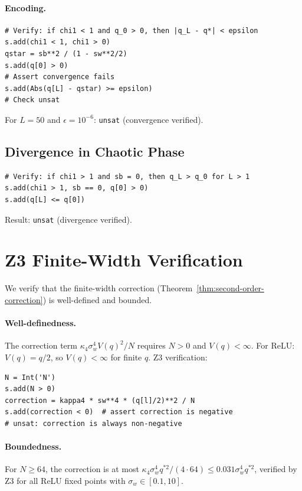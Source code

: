 \documentclass[10pt]{article}
\begin{document}
\paragraph{Encoding.}
\begin{verbatim}
# Verify: if chi1 < 1 and q_0 > 0, then |q_L - q*| < epsilon
s.add(chi1 < 1, chi1 > 0)
qstar = sb**2 / (1 - sw**2/2)
s.add(q[0] > 0)
# Assert convergence fails
s.add(Abs(q[L] - qstar) >= epsilon)
# Check unsat
\end{verbatim}

For $L = 50$ and $\epsilon = 10^{-6}$: \texttt{unsat} (convergence verified).

\subsection{Divergence in Chaotic Phase}

\begin{verbatim}
# Verify: if chi1 > 1 and sb = 0, then q_L > q_0 for L > 1
s.add(chi1 > 1, sb == 0, q[0] > 0)
s.add(q[L] <= q[0])
\end{verbatim}

Result: \texttt{unsat} (divergence verified).

\section{Z3 Finite-Width Verification}
\label{app:z3-finite-width}

We verify that the finite-width correction (Theorem~\ref{thm:second-order-correction}) is well-defined and bounded.

\paragraph{Well-definedness.}
The correction term $\kappa_4 \sigma_w^4 V(q)^2 / N$ requires $N > 0$ and $V(q) < \infty$.
For ReLU: $V(q) = q/2$, so $V(q) < \infty$ for finite $q$.
Z3 verification:
\begin{verbatim}
N = Int('N')
s.add(N > 0)
correction = kappa4 * sw**4 * (q[l]/2)**2 / N
s.add(correction < 0)  # assert correction is negative
# unsat: correction is always non-negative
\end{verbatim}

\paragraph{Boundedness.}
For $N \geq 64$, the correction is at most $\kappa_4 \sigma_w^4 q^{*2}/(4 \cdot 64) \leq 0.031 \sigma_w^4 q^{*2}$, verified by Z3 for all ReLU fixed points with $\sigma_w \in [0.1, 10]$.
\end{document}
